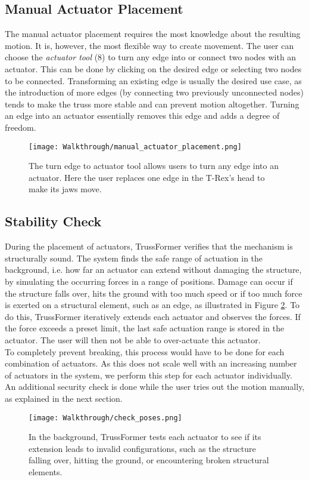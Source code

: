 \subsection{Manual Actuator Placement}
The manual actuator placement requires the most knowledge about the resulting motion. It is, however, the most flexible way to create movement. The user can choose the \textit{actuator tool} (8) to turn any edge into or connect two nodes with an actuator. This can be done by clicking on the desired edge or selecting two nodes to be connected. Transforming an existing edge is usually the desired use case, as the introduction of more edges (by connecting two previously unconnected nodes) tends to make the truss more stable and can prevent motion altogether. Turning an edge into an actuator essentially removes this edge and adds a degree of freedom.
\begin{figure}[ht!]
    \texttt{[image: Walkthrough/manual\_actuator\_placement.png]}
    \centering
    \caption{The turn edge to actuator tool allows users to turn any edge into an actuator. Here the user replaces one edge in the T-Rex’s head to make its jaws move.}
    \label{fig:manual_actuator}
\end{figure}

\subsection{Stability Check}
During the placement of actuators, TrussFormer verifies that the mechanism is structurally sound. The system finds the safe range of actuation in the background, i.e. how far an actuator can extend without damaging the structure, by simulating the occurring forces in a range of positions. Damage can occur if the structure falls over, hits the ground with too much speed or if too much force is exerted on a structural element, such as an edge, as illustrated in Figure \ref{fig:check_poses}. To do this, TrussFormer iteratively extends each actuator and observes the forces. If the force exceeds a preset limit, the last safe actuation range is stored in the actuator. The user will then not be able to over-actuate this actuator.\\
To completely prevent breaking, this process would have to be done for each combination of actuators. As this does not scale well with an increasing number of actuators in the system, we perform this step for each actuator individually. An additional security check is done while the user tries out the motion manually, as explained in the next section.
\begin{figure}[ht!]
    \texttt{[image: Walkthrough/check\_poses.png]}
    \centering
    \caption{In the background, TrussFormer tests each actuator to see if its extension leads to invalid configurations, such as the structure falling over, hitting the ground, or encountering broken structural elements.}
    \label{fig:check_poses}
\end{figure}

